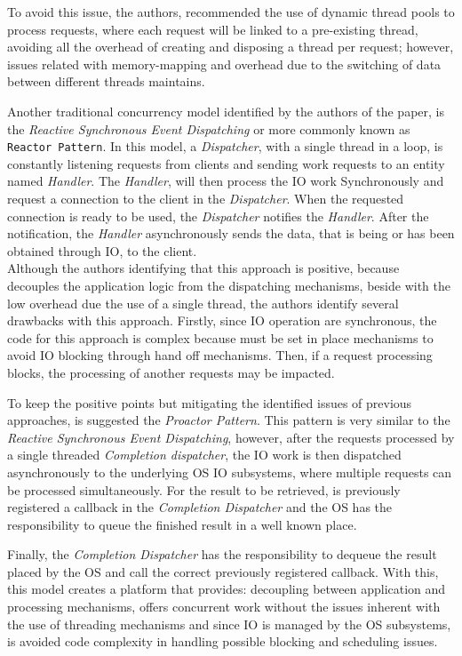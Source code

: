 To avoid this issue, the authors, recommended the use of dynamic thread pools to process requests, where each request will be linked to a pre-existing thread, avoiding all the overhead of creating and disposing a thread per request;
however, issues related with memory-mapping and overhead due to the switching of data between different threads maintains. 

Another traditional concurrency model identified by the authors of the paper, is the \textit{Reactive Synchronous Event Dispatching} or more commonly known as \texttt{Reactor Pattern}. In this model, a \textit{Dispatcher}, with a single thread in a loop, is constantly listening requests from clients and sending work requests to an entity named \textit{Handler}. 
The \textit{Handler}, will then process the IO work Synchronously and request a connection to the client in the \textit{Dispatcher}. When the requested connection is ready to be used, the \textit{Dispatcher} notifies the \textit{Handler}. After the notification, the \textit{Handler} asynchronously sends the data, that is being or has been obtained through IO, to the client.\\
Although the authors identifying that this approach is positive, because decouples the application logic from the dispatching mechanisms, beside with the low overhead due the use of a single thread, the authors identify several drawbacks with this approach. 
Firstly, since IO operation are synchronous, the code for this approach is complex because must be set in place mechanisms to avoid IO blocking through hand off mechanisms. 
Then, if a request processing blocks, the processing of another requests may be impacted. 

To keep the positive points but mitigating the identified issues of previous approaches, is suggested the \textit{Proactor Pattern}. 
This pattern is very similar to the \textit{Reactive Synchronous Event Dispatching}, however, after the requests processed by a single threaded \textit{Completion dispatcher}, 
the IO work is then dispatched asynchronously to the underlying OS IO subsystems, where multiple requests can be processed simultaneously. 
For the result to be retrieved, is previously registered a callback in the \textit{Completion Dispatcher} and the OS has the responsibility to queue the finished result in a well known place. 

Finally, the \textit{Completion Dispatcher} has the responsibility to dequeue the result placed by the OS and call the correct previously registered callback. 
With this, this model creates a platform that provides: decoupling between application and processing mechanisms,
offers concurrent work without the issues inherent with the use of threading mechanisms and since IO is managed by the OS subsystems, is avoided code complexity in handling possible blocking and scheduling issues.  


